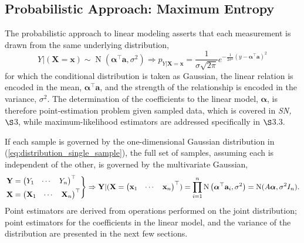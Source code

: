 \documentclass[12pt, twoside, draft]{article}
\begin{document}
\subsection{Probabilistic Approach: Maximum Entropy}\label{sec:linear_model_probabilistic}
The probabilistic approach to linear modeling asserts that each measurement is drawn from the same underlying distribution,
\begin{equation}\label{eq:distribution_single_sample}
Y| (\mathbf{X} = \mathbf{x}) \sim  \operatorname{N} \left(\boldsymbol{\alpha}^\top \mathbf{a}, \sigma^2 \right) \Rightarrow p_{Y|\mathbf{X}=\mathbf{x}} =\frac{1}{\sigma \sqrt{2 \pi}}  e^{-\frac{1}{2 \sigma^2}\left(y - \boldsymbol{\alpha}^\top \mathbf{a}\right)^2}
\end{equation}
for which the conditional distribution is taken as Gaussian, the linear relation is encoded in the mean, $\boldsymbol{\alpha}^\top \mathbf{a}$, and the strength of the relationship is encoded in the variance, $\sigma^2$.  The determination of the coefficients to the linear model, $\boldsymbol{\alpha}$, is therefore point-estimation problem given sampled data, which is covered in \textit{SN,} $\S$3, while maximum-likelihood estimators are addressed specifically in $\S$3.3.

If each sample is governed by the one-dimensional Gaussian distribution in (\ref{eq:distribution_single_sample}), the full set of samples, assuming each is independent of the other, is governed by the multivariate Gaussian,
\begin{equation}\label{eq:distribution_full_sample}
\begin{rcases}
\mathbf{Y} = \begin{pmatrix} Y_1 & \cdots & Y_n \end{pmatrix}^\top \\
\mathbf{X} = \begin{pmatrix} \mathbf{X}_1 & \cdots & \mathbf{X}_n \end{pmatrix}^\top
\end{rcases}
\Rightarrow
\mathbf{Y} | (\mathbf{X} = \begin{pmatrix} \mathbf{x}_1 & \cdots & \mathbf{x}_n \end{pmatrix}^\top ) = \prod_{i = 1}^n \operatorname{N} \left( \boldsymbol{\alpha}^\top \mathbf{a}_i, \sigma^2 \right) = \operatorname{N}(A \boldsymbol{\alpha}, \sigma^2 I_n).
\end{equation}
Point estimators are derived from operations performed on the joint distribution; point estimators for the coefficients in the linear model, and the variance of the distribution are presented in the next few sections.
\end{document}
